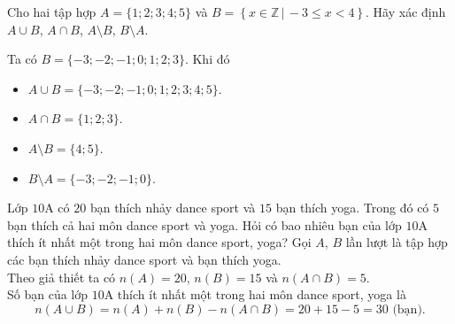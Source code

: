\begin{bt}%
	Cho hai tập hợp $A=\{1;2;3;4;5\}$ và $B=\left \{x\in\mathbb{Z}\,|\,-3\le x<4 \right \}$. Hãy xác định $A\cup B$, $A\cap B$, $A\setminus B$, $B\setminus A$.
	\loigiai
	{
		Ta có $B=\{-3;-2;-1;0;1;2;3\}$. Khi đó
		\begin{itemize}
			\item $A\cup B=\{-3;-2;-1;0;1;2;3;4;5\}$.
			\item $A\cap B=\{1;2;3\}$.
			\item $A\setminus B=\{4;5\}$.
			\item $B\setminus A=\{-3;-2;-1;0\}$.
		\end{itemize}
	}
\end{bt}

\begin{bt}%
	Lớp $10$A có $20$ bạn thích nhảy dance sport và $15$ bạn thích yoga. Trong đó có $5$ bạn thích cả hai môn dance sport và yoga. Hỏi có bao nhiêu bạn của lớp $10$A thích ít nhất một trong hai môn dance sport, yoga?
	\loigiai
	{Gọi $A$, $B$ lần lượt là tập hợp các bạn thích nhảy dance sport và bạn thích yoga.\\
	Theo giả thiết ta có $n(A)=20$, $n(B)=15$ và $n(A\cap B)=5$.\\
		Số bạn của lớp $10$A thích ít nhất một trong hai môn dance sport, yoga là
		 \[ n(A\cup B)=n(A)+n(B)- n(A\cap B)=20+15-5=30\text{ (bạn)}.\]
	}
\end{bt}

